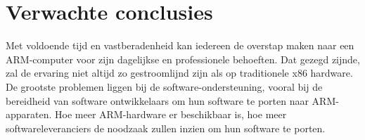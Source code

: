 \section{Verwachte conclusies}
\label{sec:verwachte_conclusies}

Met voldoende tijd en vastberadenheid kan iedereen de overstap maken naar een ARM-computer voor zijn dagelijkse en professionele behoeften. Dat gezegd zijnde, zal de ervaring niet altijd zo gestroomlijnd zijn als op traditionele x86 hardware. De grootste problemen liggen bij de software-ondersteuning, vooral bij de bereidheid van software ontwikkelaars om hun software te porten naar ARM-apparaten. Hoe meer ARM-hardware er beschikbaar is, hoe meer softwareleveranciers de noodzaak zullen inzien om hun software te porten. 

